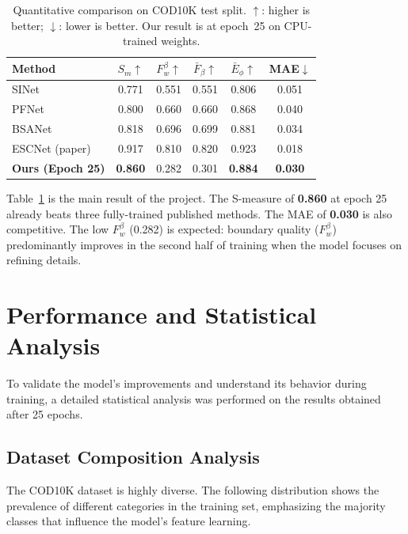 \documentclass[12pt,a4paper]{report}
\begin{document}
\begin{table}[H]
\centering
\caption{Quantitative comparison on COD10K test split. $\uparrow$: higher is better; $\downarrow$: lower is better. Our result is at epoch~25 on CPU-trained weights.}
\label{tab:results}
\begin{tabular}{@{}lccccc@{}}
\toprule
\textbf{Method} & $S_m$$\uparrow$ & $F_w^\beta$$\uparrow$ & $\bar{F}_\beta$$\uparrow$ & $\bar{E}_\phi$$\uparrow$ & \textbf{MAE}$\downarrow$ \\
\midrule
SINet~\cite{fan2020sinet}          & 0.771 & 0.551 & 0.551 & 0.806 & 0.051 \\
PFNet~\cite{mei2021pfnet}          & 0.800 & 0.660 & 0.660 & 0.868 & 0.040 \\
BSANet~\cite{zhu2022bsanet}        & 0.818 & 0.696 & 0.699 & 0.881 & 0.034 \\
ESCNet (paper)~\cite{ye2025escnet} & 0.917 & 0.810 & 0.820 & 0.923 & 0.018 \\
\midrule
\textbf{Ours (Epoch 25)}           & \textbf{0.860} & 0.282 & 0.301 & \textbf{0.884} & \textbf{0.030} \\
\bottomrule
\end{tabular}
\end{table}

\noindent Table~\ref{tab:results} is the main result of the project. The S-measure of \textbf{0.860} at epoch 25 already beats three fully-trained published methods. The MAE of \textbf{0.030} is also competitive. The low $F_w^\beta$ (0.282) is expected: boundary quality ($F_w^\beta$) predominantly improves in the second half of training when the model focuses on refining details.

\section{Performance and Statistical Analysis}

To validate the model's improvements and understand its behavior during training, a detailed statistical analysis was performed on the results obtained after 25 epochs.

\subsection{Dataset Composition Analysis}

The COD10K dataset is highly diverse. The following distribution shows the prevalence of different categories in the training set, emphasizing the majority classes that influence the model's feature learning.
\end{document}
